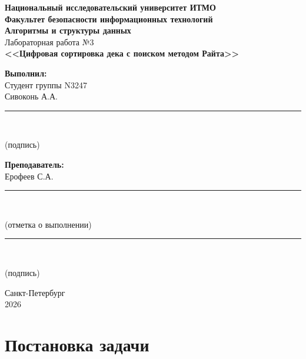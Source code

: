 \documentclass[a4paper,14pt]{extarticle}
\begin{document}
\begin{titlepage}
\begin{center}

\textbf{Национальный исследовательский университет ИТМО}\\[0.5cm]
\textbf{Факультет безопасности информационных технологий}\\[2cm]

{\Large\textbf{Алгоритмы и структуры данных}}\\[1cm]
{\large Лабораторная работа №3}\\[0.5cm]
{\large\textbf{<<Цифровая сортировка дека с поиском методом Райта>>}}\\[3cm]

\begin{flushright}
\begin{minipage}{0.45\textwidth}
\textbf{Выполнил:}\\
Студент группы N3247\\
Сивоконь А.А.\\[1cm]

\noindent\rule{6cm}{0.4pt}\\
\centerline{(подпись)}

\vspace{0.5cm}

\textbf{Преподаватель:}\\
Ерофеев С.А.\\[1cm]
\noindent\rule{6cm}{0.4pt}\\
\centerline{(отметка о выполнении)}

\vspace{1.5cm}

\noindent\rule{6cm}{0.4pt}\\
\centerline{(подпись)}
\end{minipage}
\end{flushright}

\vfill

Санкт-Петербург\\
2026

\end{center}
\end{titlepage}

\newpage
\renewcommand{\contentsname}{Содержание}
\tableofcontents

\newpage
\section{Постановка задачи}
\end{document}

